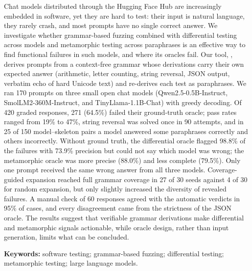 Chat models distributed through the Hugging Face Hub are increasingly embedded in software, yet they are hard to test: their input is natural language, they rarely crash, and most prompts have no single correct answer. We investigate whether grammar-based fuzzing combined with differential testing across models and metamorphic testing across paraphrases is an effective way to find functional failures in such models, and where its oracles fail. Our tool, , derives prompts from a context-free grammar whose derivations carry their own expected answer (arithmetic, letter counting, string reversal, JSON output, verbatim echo of hard Unicode text) and re-derives each test as paraphrases. We ran 170 prompts on three small open chat models (Qwen2.5-0.5B-Instruct, SmolLM2-360M-Instruct, and TinyLlama-1.1B-Chat) with greedy decoding. Of 420 graded responses, 271 (64.5\%) failed their ground-truth oracle; pass rates ranged from 19\% to 47\%, string reversal was solved once in 90 attempts, and in 25 of 150 model--skeleton pairs a model answered some paraphrases correctly and others incorrectly. Without ground truth, the differential oracle flagged 98.8\% of the failures with 73.9\% precision but could not say which model was wrong; the metamorphic oracle was more precise (88.0\%) and less complete (79.5\%). Only one prompt received the same wrong answer from all three models. Coverage-guided expansion reached full grammar coverage in 27 of 30 seeds against 4 of 30 for random expansion, but only slightly increased the diversity of revealed failures. A manual check of 60 responses agreed with the automatic verdicts in 95\% of cases, and every disagreement came from the strictness of the JSON oracle. The results suggest that verifiable grammar derivations make differential and metamorphic signals actionable, while oracle design, rather than input generation, limits what can be concluded.
\par\medskip\noindent\textbf{Keywords:} software testing; grammar-based fuzzing; differential testing; metamorphic testing; large language models.
